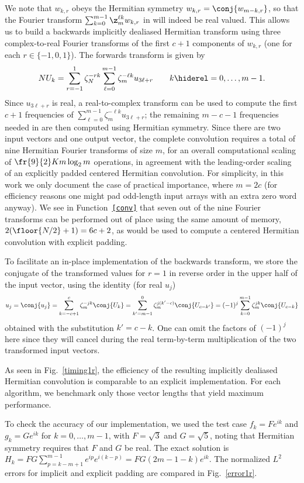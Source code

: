 \documentclass[final]{siamltex}
\def\bel{\begin{dmath}}
\def\eel{\end{dmath}}
\def\no{\hiderel}
\begin{document}
We note that $w_{k,r}$ obeys the Hermitian symmetry 
$w_{k,r}=\conj{w_{m-k,r}}$, so that the Fourier transform
$\sum_{k=0}^{m-1}\z_m^{\ell k} w_{k,r}$ in  will indeed
be real valued. This allows us to build a backwards implicitly dealiased
Hermitian transform using three complex-to-real Fourier transforms of the
first $c+1$ components of $w_{k,r}$ (one for each $r\in\{-1,0,1\}$). The
forwards transform is given by
\bel
NU_k
=\sum_{r=-1}^{1}\zeta_N^{-rk}\sum_{\ell=0}^{m-1}\zeta_m^{-\ell k} u_{3\ell+r}
\qquad k\no =0,\ldots,m-1.\label{fft0forwardsB}
\eel
Since $u_{3\ell+r}$ is real, a real-to-complex transform can be used to
compute the first $c+1$ frequencies of
$\sum_{\ell=0}^{m-1}\zeta_m^{-\ell k} u_{3\ell+r}$; the remaining $m-c-1$
frequencies needed in  are then computed using Hermitian
symmetry. Since there are two input vectors and
one output vector, the complete convolution requires a total of nine
Hermitian Fourier transforms of size $m$, for an overall computational
scaling of $\fr{9}{2}K m \log_2 m$ operations, in agreement with the
leading-order scaling of an explicitly padded centered Hermitian convolution.
For simplicity, in this work we only document the case of practical
importance, where $m=2c$ (for efficiency reasons one might pad
odd-length input arrays with an extra zero word anyway). We see in
Function~{\tt\ref{conv}} that seven out of the nine Fourier transforms can be
performed out of place using the same amount of memory,
$2(\floor{N/2}+1)=6c+2$, as would be used to compute a centered Hermitian
convolution with explicit padding. 

To facilitate an in-place implementation of the
backwards transform, we store the conjugate of the transformed values for
$r=1$ in reverse order in the upper half of the input vector,
using the identity (for real $u_j$)
$$
u_j=\conj{u_j}=\sum_{k=-c+1}^{c}\zeta_m^{-jk} \conj{U_k}
=\sum_{k'=m-1}^{0}\zeta_m^{j(k'-c)} \conj{U_{c-k'}}
=(-1)^j\sum_{k=0}^{m-1}\zeta_m^{jk} \conj{U_{c-k}}
$$
obtained with the substitution $k'=c-k$. One can omit the factors of
$(-1)^j$ here since they will cancel during the real term-by-term multiplication
of the two transformed input vectors.

As seen in Fig.~\ref{timing1r}, the efficiency of the resulting implicitly
dealiased Hermitian convolution is comparable to an explicit implementation.
For each algorithm, we benchmark only those vector lengths that yield
maximum performance.

To check the accuracy of our implementation, we used the test case
$f_k=F e^{ik}$ and $g_k=G e^{ik}$ for $k=0,\ldots,m-1$,
with $F=\sqrt 3$ and $G=\sqrt 5$, noting that Hermitian symmetry
requires that $F$ and $G$ be real. The exact solution is 
$H_k=FG\sum_{p=k-m+1}^{m-1} e^{ip}e^{i(k-p)}=FG(2m-1-k)e^{ik}$.
The normalized $L^2$ errors for implicit and explicit padding are compared
in Fig.~\ref{error1r}.
\end{document}
